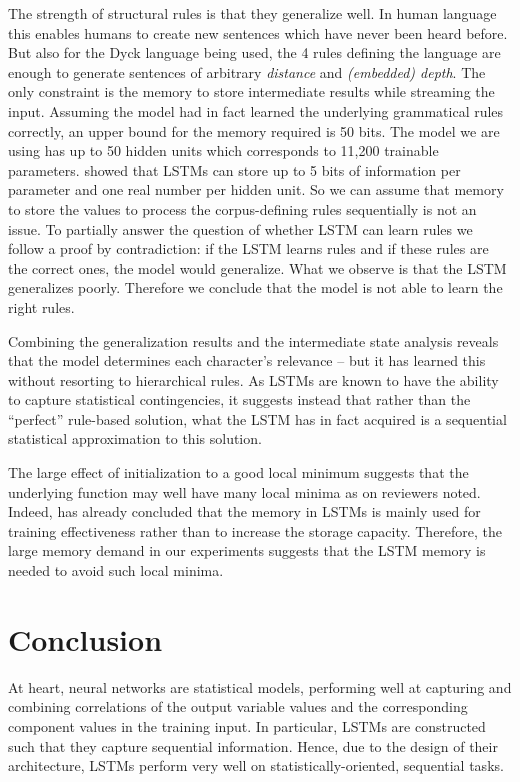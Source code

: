 \documentclass[11pt,a4paper]{article}
\begin{document}
The strength of structural rules is that they generalize well. In human language this enables humans to create new sentences which have never been heard before. But also for the Dyck language being used, the 4 rules defining the language are enough to generate sentences of arbitrary \emph{distance} and \emph{(embedded) depth}. The only constraint is the memory to store intermediate results while streaming the input. Assuming the model had in fact learned the underlying grammatical rules correctly, an upper bound for the memory required is 50 bits. The model we are using has up to 50 hidden units which corresponds to 11,200 trainable parameters. \citeauthor{collins2016capacity}  showed that LSTMs can store up to 5 bits of information per parameter and one real number per hidden unit. So we can assume that memory to store the values to process the corpus-defining rules sequentially is not an issue. To partially answer the question of whether LSTM can learn rules we follow a proof by contradiction: if the LSTM learns rules and if these rules are the correct ones, the model would generalize. What we observe is that the LSTM generalizes poorly. Therefore we conclude that the model is not able to learn the right rules.

Combining the generalization results and the intermediate state analysis reveals that the model determines each character's relevance -- but it has learned this without resorting to hierarchical rules. As LSTMs are known to have the ability to capture statistical contingencies, it suggests instead that rather than the ``perfect'' rule-based solution, what the LSTM has in fact acquired is a sequential statistical approximation to this solution.

The large effect of initialization to a good local minimum suggests that the underlying function may well have many local minima as on reviewers noted. Indeed, \citeauthor{collins2016capacity}  has already concluded that the memory in LSTMs is mainly used for training effectiveness rather than to increase the storage capacity. Therefore, the large memory demand in our experiments suggests that the LSTM memory is needed to avoid such local minima.

\section{Conclusion}

At heart, neural networks are statistical models, performing well at capturing and combining correlations of the output variable values and the corresponding component values in the training input. In particular, LSTMs are constructed such that they capture sequential information. Hence, due to the design of their architecture, LSTMs perform very well on statistically-oriented, sequential tasks. 
\end{document}
